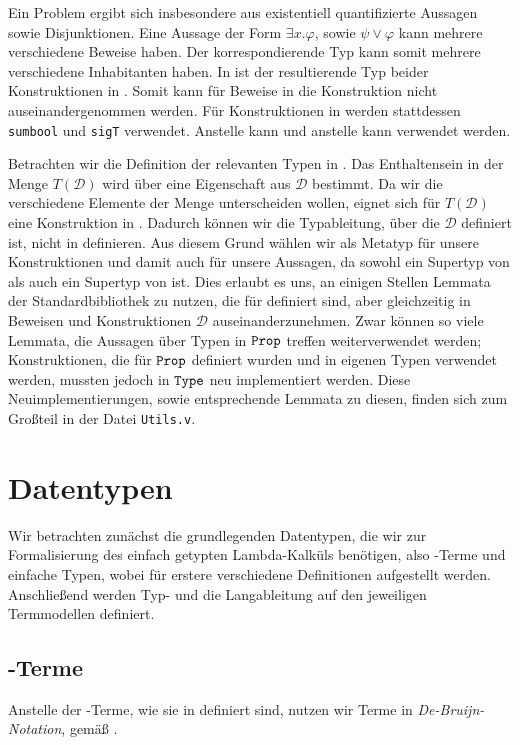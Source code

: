 Ein Problem ergibt sich insbesondere aus existentiell quantifizierte Aussagen sowie Disjunktionen. Eine Aussage der Form $\exists x.\varphi$, sowie $\psi\lor\varphi$ kann mehrere verschiedene Beweise haben. Der korrespondierende Typ kann somit mehrere verschiedene Inhabitanten haben. In \coq{} ist der resultierende Typ beider Konstruktionen in \Prop{}. Somit kann für Beweise in \Set{} die Konstruktion nicht auseinandergenommen werden. Für Konstruktionen in \Set{} werden stattdessen \texttt{sumbool} und \texttt{sigT} verwendet. Anstelle  kann  und anstelle  kann  verwendet werden.

Betrachten wir die Definition der relevanten Typen in . Das Enthaltensein in der Menge $T(\mathcal{D})$ wird über eine Eigenschaft aus $\mathcal{D}$ bestimmt. Da wir die verschiedene Elemente der Menge unterscheiden wollen, eignet sich für $T(\mathcal{D})$ eine Konstruktion in \Set. Dadurch können wir die Typableitung, über die $\mathcal{D}$ definiert ist, nicht in \Prop{} definieren. Aus diesem Grund wählen wir \Type{} als Metatyp für unsere Konstruktionen und damit auch für unsere Aussagen, da \Type{} sowohl ein Supertyp von \Set{} als auch ein Supertyp von \Prop{} ist. Dies erlaubt es uns, an einigen Stellen Lemmata der Standardbibliothek zu nutzen, die für \Prop{} definiert sind, aber gleichzeitig in Beweisen und Konstruktionen $\mathcal{D}$ auseinanderzunehmen. Zwar können so viele Lemmata, die Aussagen über Typen in $\texttt{Prop}$ treffen weiterverwendet werden; Konstruktionen, die für $\texttt{Prop}$ definiert wurden und in eigenen Typen verwendet werden, mussten jedoch in $\texttt{Type}$ neu implementiert werden. Diese Neuimplementierungen, sowie entsprechende Lemmata zu diesen, finden sich zum Großteil in der Datei \texttt{Utils.v}.

\section{Datentypen}

Wir betrachten zunächst die grundlegenden Datentypen, die wir zur Formalisierung des einfach getypten Lambda-Kalküls benötigen, also \tlambda-Terme und einfache Typen, wobei für erstere verschiedene Definitionen aufgestellt werden. Anschließend werden Typ- und die Langableitung auf den jeweiligen Termmodellen definiert.

\subsection{\tlambda-Terme}
Anstelle der \tlambda-Terme, wie sie in  definiert sind, nutzen wir Terme in \emph{De-Bruijn-Notation}, gemäß .

